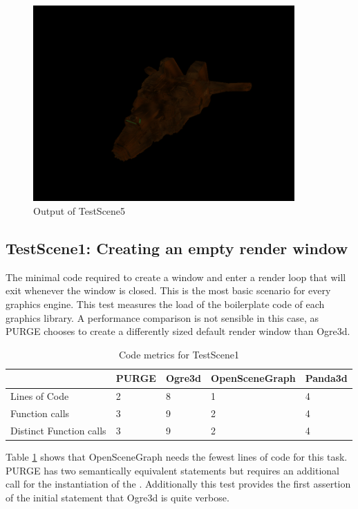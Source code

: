 \begin{figure}[htbp]
	\centering
	\includegraphics[width=10cm]{images/TestScene5.png}
	\caption{Output of TestScene5}
	\label{fig:TestScene5}
\end{figure}

\subsection{TestScene1: Creating an empty render window}

	The minimal code required to create a window and enter a render loop that will exit whenever the window is closed. This is the most basic scenario for every graphics engine. This test measures the load of the boilerplate code of each graphics library. A performance comparison is not sensible in this case, as PURGE chooses to create a differently sized default render window than Ogre3d.
	
	\begin{table}[htpb]
		\center
		\caption{Code metrics for TestScene1}
		\begin{tabular}{l | l | l | l | l}
			& PURGE & Ogre3d & OpenSceneGraph & Panda3d \\ \hline
			Lines of Code & 2 & 8 & 1 & 4\\
			Function calls & 3 & 9 & 2 & 4\\
			Distinct Function calls & 3 & 9 & 2 & 4\\
		\end{tabular}
		\label{tbl:Code1}
	\end{table}

	Table \ref{tbl:Code1} shows that OpenSceneGraph needs the fewest lines of code for this task. PURGE has two semantically equivalent statements but requires an additional call for the instantiation of the . Additionally this test provides the first assertion of the initial statement that Ogre3d is quite verbose.

